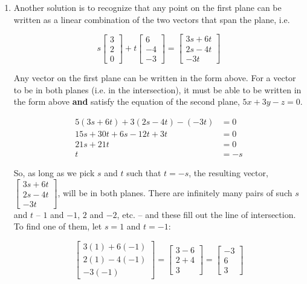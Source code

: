 \documentclass[11pt]{article}
\begin{document}
\begin{prob}[(12 pts)]
\begin{subprob}
\begin{solution}
\begin{enumerate}
    \item Another solution is to recognize that any point on the first plane can be written as a linear combination of the two vectors that span the plane, i.e.
    
    $$s \begin{bmatrix} 3 \\ 2 \\ 0 \end{bmatrix} + t \begin{bmatrix} 6 \\ -4 \\ -3 \end{bmatrix} = \begin{bmatrix} 3s + 6t \\ 2s - 4t \\ -3t \end{bmatrix}$$

    Any vector on the first plane can be written in the form above. For a vector to be in both planes (i.e. in the intersection), it must be able to be written in the form above \textbf{and} satisfy the equation of the second plane, $5x + 3y - z = 0$.

    \begin{align*}
        5(3s + 6t) + 3(2s - 4t) - (-3t) &= 0 \\
        15s + 30t + 6s - 12t + 3t &= 0 \\
        21s + 21t &= 0 \\
        t &= -s
    \end{align*}

    So, as long as we pick $s$ and $t$ such that $t = -s$, the resulting vector, $\begin{bmatrix} 3s + 6t \\ 2s - 4t \\ -3t \end{bmatrix}$, will be in both planes. There are infinitely many pairs of such $s$ and $t$ – $1$ and $-1$, $2$ and $-2$, etc. – and these fill out the line of intersection. To find one of them, let $s = 1$ and $t = -1$:

    $$\begin{bmatrix} 3(1) + 6(-1) \\ 2(1) - 4(-1) \\ -3(-1) \end{bmatrix} = \begin{bmatrix} 3 - 6 \\ 2 + 4 \\ 3 \end{bmatrix} = \begin{bmatrix} -3 \\ 6 \\ 3 \end{bmatrix}$$


\end{enumerate}
\end{solution}
\end{subprob}
\end{prob}
\end{document}
